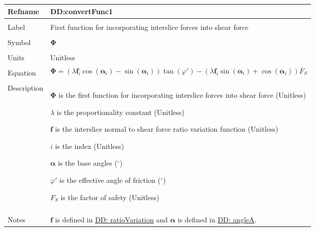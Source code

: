 \documentclass[12pt]{article}
\begin{document}
\vspace{\baselineskip}
\noindent
\begin{minipage}{\textwidth}
\begin{tabular}{>{\raggedright}p{}>{\raggedright\arraybackslash}p{}}
\toprule \textbf{Refname} & \textbf{DD:convertFunc1}
\label{DD:convertFunc1}
\\ \midrule \\
Label & First function for incorporating interslice forces into shear force
        
\\ \midrule \\
Symbol & $\mathbf{Φ}$
         
\\ \midrule \\
Units & Unitless
        
\\ \midrule \\
Equation & \begin{displaymath}
           \mathbf{Φ}=\left(λ {\mathbf{f}}_{i} \cos\left({\mathbf{α}}_{i}\right)-\sin\left({\mathbf{α}}_{i}\right)\right) \tan\left(φ'\right)-\left(λ {\mathbf{f}}_{i} \sin\left({\mathbf{α}}_{i}\right)+\cos\left({\mathbf{α}}_{i}\right)\right) {F_{S}}
           \end{displaymath}
\\ \midrule \\
Description & \begin{symbDescription}
              \item{$\mathbf{Φ}$ is the first function for incorporating interslice forces into shear force (Unitless)}
              \item{$λ$ is the proportionality constant (Unitless)}
              \item{$\mathbf{f}$ is the interslice normal to shear force ratio variation function (Unitless)}
              \item{$i$ is the index (Unitless)}
              \item{$\mathbf{α}$ is the base angles (${}^{\circ}$)}
              \item{$φ'$ is the effective angle of friction (${}^{\circ}$)}
              \item{${F_{S}}$ is the factor of safety (Unitless)}
              \end{symbDescription}
\\ \midrule \\
Notes & $\mathbf{f}$ is defined in \hyperref[DD:ratioVariation]{DD: ratioVariation} and $\mathbf{α}$ is defined in \hyperref[DD:angleA]{DD: angleA}.
        

\end{tabular}
\end{minipage}
\end{document}
